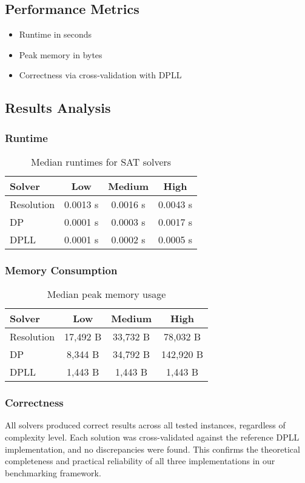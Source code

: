 \documentclass[11pt]{article}
\begin{document}
\subsection{Performance Metrics}
\begin{itemize}
  \item Runtime in seconds
  \item Peak memory in bytes
  \item Correctness via cross-validation with DPLL
\end{itemize}

\subsection{Results Analysis}
\subsubsection*{Runtime}
\begin{table}[H]
\centering
\begin{tabular}{lccc}
\toprule
Solver & Low & Medium & High \\
\midrule
Resolution & 0.0013 s & 0.0016 s & 0.0043 s \\
DP         & 0.0001 s & 0.0003 s & 0.0017 s \\
DPLL       & 0.0001 s & 0.0002 s & 0.0005 s \\
\bottomrule
\end{tabular}
\caption{Median runtimes for SAT solvers}
\end{table}

\subsubsection*{Memory Consumption}
\begin{table}[H]
\centering
\begin{tabular}{lccc}
\toprule
Solver & Low & Medium & High \\
\midrule
Resolution & 17,492 B & 33,732 B & 78,032 B \\
DP         & 8,344 B  & 34,792 B & 142,920 B \\
DPLL       & 1,443 B  & 1,443 B  & 1,443 B \\
\bottomrule
\end{tabular}
\caption{Median peak memory usage}
\end{table}

\subsubsection*{Correctness}
\hspace*{2em}
All solvers produced correct results across all tested instances, regardless of complexity level. Each solution was cross-validated against the reference DPLL implementation, and no discrepancies were found. This confirms the theoretical completeness and practical reliability of all three implementations in our benchmarking framework.
\end{document}
